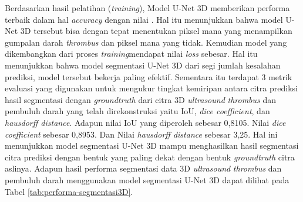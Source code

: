 Berdasarkan hasil pelatihan (\textit{training}), Model U-Net 3D memberikan performa terbaik dalam hal \textit{accuracy} dengan nilai . Hal itu menunjukkan bahwa model U-Net 3D tersebut bisa dengan tepat menentukan piksel mana yang menampilkan gumpalan darah \textit{thrombus} dan piksel mana yang tidak. Kemudian model yang dikembangkan dari proses \textit{training}mendapat nilai \textit{loss} sebesar. Hal itu menunjukkan bahwa model segmentasi U-Net 3D dari segi jumlah kesalahan prediksi, model tersebut bekerja paling efektif. Sementara itu terdapat 3 metrik evaluasi yang digunakan untuk mengukur tingkat kemiripan antara citra prediksi hasil segmentasi dengan \textit{groundtruth} dari citra 3D \textit{ultrasound} \textit{thrombus} dan pembuluh darah yang telah direkonstruksi yaitu IoU, \textit{dice coefficient}, dan \textit{hausdorff distance}. Adapun nilai IoU yang diperoleh sebesar 0,8105. Nilai \textit{dice coefficient} sebesar 0,8953. Dan Nilai \textit{hausdorff distance} sebesar 3,25. Hal ini menunjukkan model segmentasi U-Net 3D mampu menghasilkan hasil segmentasi citra prediksi dengan bentuk yang paling dekat dengan bentuk \textit{groundtruth} citra aslinya. Adapun hasil performa segmentasi data 3D \textit{ultrasound} \textit{thrombus} dan pembuluh darah menggunakan model segmentasi U-Net 3D dapat dilihat pada Tabel \ref{tab:performa-segmentasi3D}.

\begin{table}[htbp]
	\centering
	\caption{Performa Segmentasi 3D Citra Ultrasound Pembuluh Darah Dan Thrombus Menggunakan Model Segmentasi U-Net 3D}
	\label{tab:performa-segmentasi3D}
\end{table}

